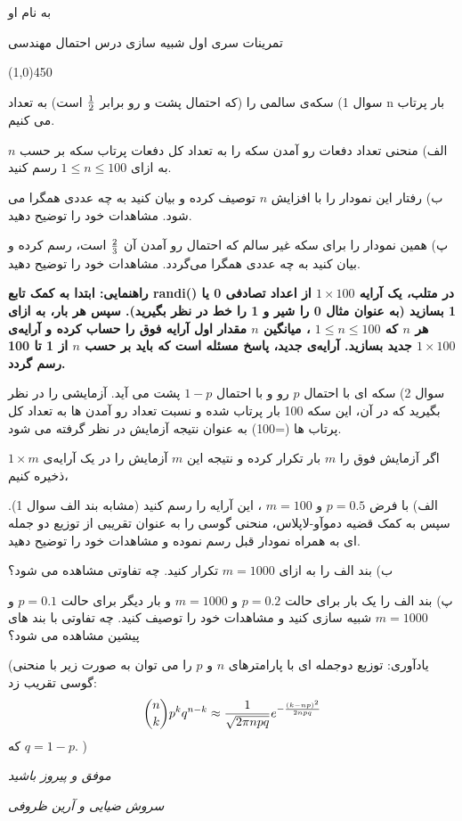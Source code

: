 \documentclass[10pt,letterpaper]{article}
\newcommand{\hl}{
\begin{center}
\line(1,0){450}
\end{center}}
\begin{document}
\Large
\begin{center}
به نام او

تمرینات سری اول شبیه سازی درس احتمال مهندسی
\hl
\end{center}
سوال 1) سکه‌ی سالمی را (که احتمال پشت و رو برابر $1\over 2$ است) به تعداد n بار پرتاب می کنیم.

الف) منحنی تعداد دفعات رو آمدن سکه را به تعداد کل دفعات پرتاب سکه بر حسب $n$ به ازای $1\le n\le 100$ رسم کنید.

ب) رفتار این نمودار را با افزایش $n$ توصیف کرده و بیان کنید به چه عددی همگرا می شود. مشاهدات خود را توضیح دهید.

پ) همین نمودار را برای سکه غیر سالم که احتمال رو آمدن آن
$
{2\over 3}
$
است،  رسم کرده و بیان کنید به چه عددی همگرا می‌گردد. مشاهدات خود را توضیح دهید.

\textbf{
راهنمایی: ابتدا به کمک تابع 
randi()
در متلب، یک آرایه 
$1\times 100$
 از اعداد تصادفی 0 یا 1 بسازید (به عنوان مثال 0 را شیر و 1 را خط در نظر بگیرید). سپس هر بار، به ازای هر $n$ که
$1\le n \le 100$
، 
میانگین
$n$
 مقدار اول آرایه فوق را حساب کرده و آرایه‌ی $1\times 100$ جدید بسازید. آرایه‌ی جدید، پاسخ مسئله است که باید بر حسب $n$ از 1 تا 100 رسم گردد.
}

سوال 2) سکه ای با احتمال $p$ رو و با احتمال $1-p$ پشت می آید. آزمایشی را در نظر بگیرید که در آن، این سکه 100 بار پرتاب شده و نسبت تعداد رو آمدن ها به تعداد کل پرتاب ها (=100) به عنوان نتیجه آزمایش در نظر گرفته می شود.

اگر آزمایش فوق را $m$ بار تکرار کرده و نتیجه این $m$ آزمایش را در یک آرایه‌ی 
$
1\times m
$
 ذخیره کنیم،

الف) با فرض 
$
p=0.5
$
و
$
m=100
$
، این آرایه را رسم کنید (مشابه بند الف سوال 1). سپس به کمک قضیه دموآو-لاپلاس، منحنی گوسی را به عنوان تقریبی از توزیع دو جمله ای به همراه نمودار قبل رسم نموده و مشاهدات خود را توضیح دهید.

ب) بند الف را به ازای $m=1000$ تکرار کنید. چه تفاوتی مشاهده می شود؟

پ) بند الف را یک بار برای حالت 
$
p=0.2
$
و
$
m=1000
$
و بار دیگر برای حالت 
$
p=0.1
$
و
$
m=1000
$
شبیه سازی کنید و مشاهدات خود را توصیف کنید. چه تفاوتی با بند های پیشین مشاهده می شود؟

(یادآوری: توزیع دوجمله ای با پارامترهای $n$ و $p$ را می توان به صورت زیر با منحنی گوسی تقریب زد:
$$
\binom{n}{k}p^kq^{n-k}\approx {1\over\sqrt{2\pi npq}}e^{-{(k-np)^2\over 2npq}}
$$
که 
$
q=1-p
$.
)

\vspace{10mm}
\textit{
\hspace{10mm}
موفق و پیروز باشید
}

\textit{
\hspace{20mm}
سروش ضیایی و آرین ظروفی
}
\end{document}
